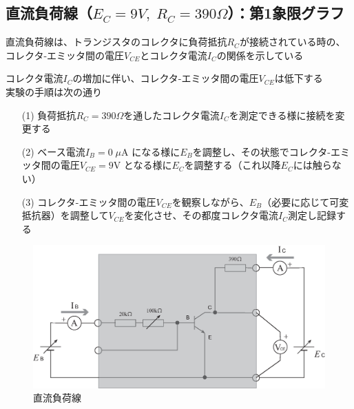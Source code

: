 \documentclass[uplatex,a4paper,11pt,oneside,openany]{jsbook}
\begin{document}
\newpage

\subsection{直流負荷線（$E_C=9V,\;R_C=390\Omega$）：第1象限グラフ}

直流負荷線は、トランジスタのコレクタに負荷抵抗$R_C$が接続されている時の、
コレクタ-エミッタ間の電圧$V_{CE}$とコレクタ電流$I_C$の関係を示している

コレクタ電流$I_C$の増加に伴い、コレクタ-エミッタ間の電圧$V_{CE}$は低下する\\

実験の手順は次の通り

\begin{enumerate}
\item[(1)] 負荷抵抗$R_C=390\Omega$を通したコレクタ電流$I_C$を測定できる様に接続を変更する
\item[(2)] ベース電流$I_B=0\;\mu$A になる様に$E_B$を調整し、その状態でコレクタ-エミッタ間の電圧$V_{CE}=9$V となる様に$E_C$を調整する（これ以降$E_C$には触らない）
\item[(3)] コレクタ-エミッタ間の電圧$V_{CE}$を観察しながら、$E_B$（必要に応じて可変抵抗器）を調整して$V_{CE}$を変化させ、その都度コレクタ電流$I_C$測定し記録する  
\end{enumerate}


\vfill

\begin{figure}[H]
  \centering
   \includegraphics[keepaspectratio, scale=0.45, angle=0]
               {figs/eps/ex4.eps}
               \caption{直流負荷線}
               \label{fig:ex3}
\end{figure}

\vfill
\end{document}
